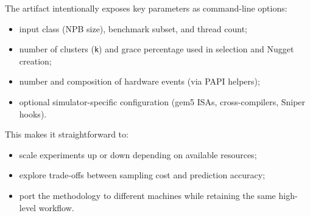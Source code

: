 The artifact intentionally exposes key parameters as command-line options:
\begin{itemize}
  \item input class (NPB size), benchmark subset, and thread count;
  \item number of clusters (\texttt{k}) and grace percentage used in selection and Nugget creation;
  \item number and composition of hardware events (via PAPI helpers);
  \item optional simulator-specific configuration (gem5 ISAs, cross-compilers, Sniper hooks).
\end{itemize}

This makes it straightforward to:
\begin{itemize}
  \item scale experiments up or down depending on available resources;
  \item explore trade-offs between sampling cost and prediction accuracy;
  \item port the methodology to different machines while retaining the same high-level workflow.
\end{itemize}
